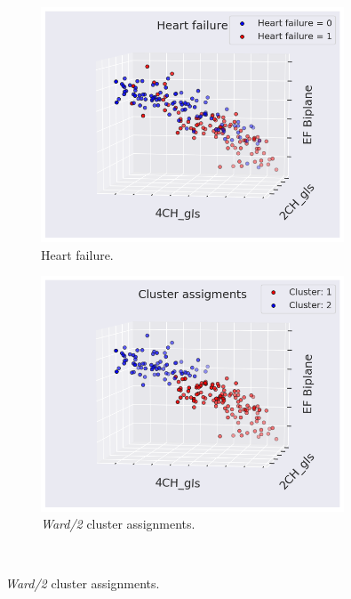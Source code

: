 \begin{figure}[htb]
    \centering
    \begin{subfigure}[b]{0.49\textwidth}
        \centering
        \includegraphics[width=0.99\textwidth]{results/scatter_gls_EF_hf.png}
        \caption{Heart failure.}
        \label{fig:scatter_gls_ef_hf}
    \end{subfigure}
    \begin{subfigure}[b]{0.49\textwidth}
        \centering
        \includegraphics[width=0.99\textwidth]{results/scatter_gls_EF_ward2.png}
        \caption{\textit{Ward/2} cluster assignments.}
        \label{fig:scatter_gls_ef_ward2}
    \end{subfigure}\\

\end{figure}
